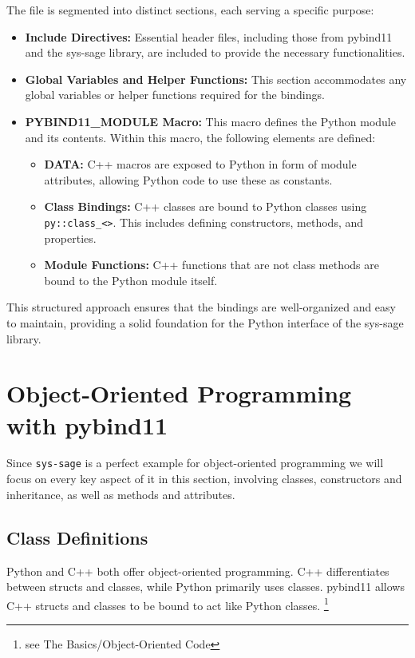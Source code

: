 The file is segmented into distinct sections, each serving a specific purpose:

\begin{itemize}
    \item   \textbf{Include Directives:} Essential header files, including those from pybind11 and the sys-sage library, are included to provide the necessary functionalities.
    \item   \textbf{Global Variables and Helper Functions:} This section accommodates any global variables or helper functions required for the bindings.
    \item   \textbf{PYBIND11\_MODULE Macro:} This macro defines the Python module and its contents. Within this macro, the following elements are defined:
        \begin{itemize}
            \item   \textbf{DATA:} C++ macros are exposed to Python in form of module attributes, allowing Python code to use these as constants.
            \item   \textbf{Class Bindings:} C++ classes are bound to Python classes using \verb|py::class_<>|. This includes defining constructors, methods, and properties.
            \item   \textbf{Module Functions:} C++ functions that are not class methods are bound to the Python module itself.
        \end{itemize}
\end{itemize}

This structured approach ensures that the bindings are well-organized and easy to maintain, providing a solid foundation for the Python interface of the sys-sage library.


\section{Object-Oriented Programming with pybind11}

Since \texttt{sys-sage} is a perfect example for object-oriented programming we will focus on every key aspect of it in this section, involving classes, constructors and inheritance, as well as methods and attributes.

\subsection{Class Definitions}

Python and C++ both offer object-oriented programming. C++ differentiates between structs and classes, while Python primarily uses classes. pybind11 allows C++ structs and classes to be bound to act like Python classes. \cite{pybind11-docu}\footnote{see The Basics/Object-Oriented Code\label{fn:OOP}}

